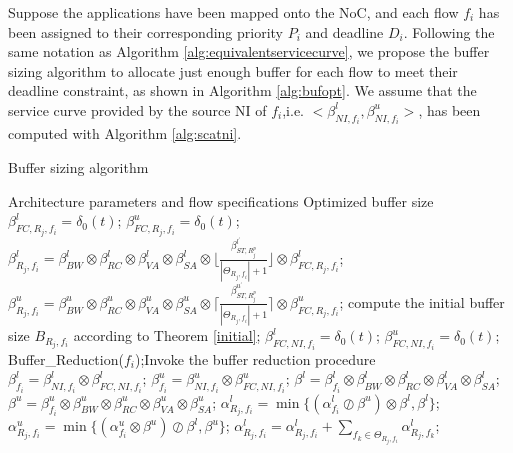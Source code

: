 \documentclass[preprint]{elsarticle}
\begin{document}
Suppose the applications have been mapped onto the NoC, and each flow $f_i$ has been assigned to their corresponding priority $P_i$ and deadline $D_i$. Following the same notation as Algorithm \ref{alg:equivalentservicecurve}, we propose the buffer sizing algorithm to allocate just enough buffer for each flow to meet their deadline constraint, as shown in Algorithm \ref{alg:bufopt}. We assume that the service curve provided by the source NI of $f_i$,i.e. $<\beta_{NI,f_i}^l,\beta_{NI,f_i}^u>$, has been computed with Algorithm \ref{alg:scatni}.
\begin{algorithm}[!h]
\caption{Buffer sizing algorithm}
\label{alg:bufopt}
\begin{algorithmic}[1]
\Require Architecture parameters and flow specifications
\Ensure Optimized buffer size
            \State $\beta_{FC,R_j,f_i}^l=\delta_0(t)$; $\beta_{FC,R_j,f_i}^u=\delta_0(t)$;
            \State $\beta_{R_j,f_i}^l=\beta_{BW}^l\otimes\beta_{RC}^l\otimes\beta_{VA}^l\otimes\beta_{SA}^l\otimes\lfloor\frac{\beta_{ST,R_j^{p}}^{l^\prime}}{|\Theta_{R_j,f_i}|+1}\rfloor\otimes\beta_{FC,R_j,f_i}^l$;
            \State $\beta_{R_j,f_i}^u=\beta_{BW}^u\otimes\beta_{RC}^u\otimes\beta_{VA}^u\otimes\beta_{SA}^u\otimes\lceil\frac{\beta_{ST,R_j^{p}}^{u^\prime}}{|\Theta_{R_j,f_i}|+1}\rceil\otimes\beta_{FC,R_j,f_i}^u$;
            \State compute the initial buffer size $B_{R_j,f_i}$ according to Theorem \ref{initial};
        \EndFor
        \State $\beta_{FC,NI,f_i}^l=\delta_0(t)$; $\beta_{FC,NI,f_i}^u=\delta_0(t)$;
        \State Buffer\_Reduction($f_i$);\Comment Invoke the buffer reduction procedure
        \State $\beta_{f_i}^l=\beta_{NI,f_i}^l\otimes\beta_{FC,NI,f_i}^l$; $\beta_{f_i}^u=\beta_{NI,f_i}^u\otimes\beta_{FC,NI,f_i}^u$;
                \State $\beta^l=\beta^l_{f_i}\otimes\beta_{BW}^l\otimes\beta_{RC}^l\otimes\beta_{VA}^l\otimes\beta_{SA}^l$;
                \State $\beta^u=\beta^u_{f_i}\otimes\beta_{BW}^u\otimes\beta_{RC}^u\otimes\beta_{VA}^u\otimes\beta_{SA}^u$;
                \State $\alpha^l_{R_j,f_i}=\min\{(\alpha^l_{f_i}\oslash\beta^u)\otimes\beta^l,\beta^l\}$;
                \State $\alpha^u_{R_j,f_i}=\min\{(\alpha^u_{f_i}\otimes\beta^u)\oslash\beta^l,\beta^u\}$;
                    \State $\alpha^l_{R_j,f_i}=\alpha^l_{R_j,f_i}+\sum_{f_k\in\Theta_{R_j,f_i}}\alpha^l_{R_j,f_k}$;

\end{algorithmic}
\end{algorithm}
\end{document}
